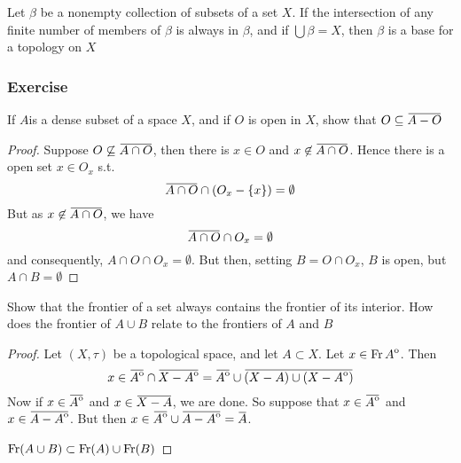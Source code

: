 \documentclass[11pt]{article}
\begin{document}
\begin{theorem}[]
Let \(\beta\) be a nonempty collection of subsets of a set \(X\). If the
intersection of any finite number of members of \(\beta\) is always in \(\beta\), and
if \(\bigcup\beta=X\), then \(\beta\) is a base for a topology on \(X\)
\end{theorem}

\subsubsection{Exercise}
\label{sec:org6b165ec}
\begin{exercise}
\label{ex2.1.5}
If \(A\)is a dense subset of a space \(X\), and if \(O\) is open in \(X\),
show that \(O\subseteq\bbar{A-O}\)
\end{exercise}

\begin{proof}
Suppose \(O\not\subseteq\bbar{A\cap O}\), then there is \(x\in O\) and
\(x\not\in\bbar{A\cap O}\). Hence there is a open set \(x\in O_x\) s.t.
\begin{equation*}
\bbar{A\cap O}\cap(O_x-\{x\})=\emptyset
\end{equation*}
But as \(x\not\in\bbar{A\cap O}\), we have
\begin{equation*}
\bbar{A\cap O}\cap O_x=\emptyset
\end{equation*}
and consequently, \(A\cap O\cap O_x=\emptyset\). But then, setting \(B=O\cap
    O_x\), \(B\) is open, but \(A\cap B=\emptyset\)
\end{proof}

\begin{exercise}
\label{ex2.1.10}
Show that the frontier of a set always contains the frontier of its
interior. How does the frontier of \(A\cup B\) relate to the frontiers of
\(A\) and \(B\)
\end{exercise}

\begin{proof}
Let \((X,\tau)\) be a topological space, and let \(A\subset X\). Let
\(x\in\operatorname{Fr}{\kern0ptA}^{\mathrm{o}}\). Then
\begin{equation*}
x\in\bbar{\interior{A}}\cap\bbar{X-\interior{A}}=
\bbar{\interior{A}}\cup\bbar{(X-A)\cup(X-\interior{A})}
\end{equation*}
Now if \(x\in\bbar{\interior{A}}\) and \(x\in\bbar{X-A}\), we are done.
So suppose that \(x\in\bbar{\interior{A}}\) and
\(x\in\bbar{A-\interior{A}}\). But then
\(x\in\bbar{\interior{A}}\cup\bbar{A-\interior{A}}=\bbar{A}\).

\(\operatorname{Fr}(A\cup B)\subset\operatorname{Fr}(A)\cup\operatorname{Fr}(B)\)
\end{proof}
\end{document}
